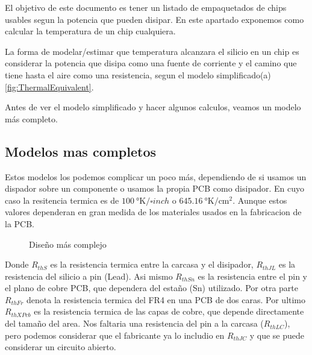 El objetivo de este documento es tener un listado de empaquetados de chips usables segun
la potencia que pueden disipar. En este apartado exponemos como calcular la temperatura de un
chip cualquiera.

La forma de modelar/estimar que temperatura alcanzara el silicio en un chip es considerar
la potencia que disipa como una fuente de corriente y el camino que tiene hasta el aire como
una resistencia, segun el modelo simplificado(a)\ref{fig:ThermalEquivalent}.

Antes de ver el modelo simplificado y hacer algunos calculos, veamos un modelo más completo.

\subsection{Modelos mas completos}
Estos modelos los podemos complicar un poco más, dependiendo de si usamos un dispador sobre un componente o
usamos la propia PCB como disipador. En cuyo caso la resitencia termica es
de $\SI{100}{\degree\kelvin/\square{inch}}$ o $\SI{645.16}{\degree\kelvin/\square\cm}$.
Aunque estos valores dependeran en gran medida de los materiales usados en la
fabricacion de la PCB.


\begin{figure}[H]
    \centering
    
    \caption{Diseño más complejo}
    \label{fig:ThermalEquivFull}
\end{figure}

Donde $R_{thS}$ es la resistencia termica entre la carcasa y el disipador, $R_{thJL}$ es la
resistencia del silicio a pin (Lead). Asi mismo $R_{thSn}$ es la resistencia entre el pin
y el plano de cobre PCB, que dependera del estaño (Sn) utilizado. Por otra parte $R_{thFr}$
denota la resistencia termica del FR4 en una PCB de dos caras. Por ultimo $R_{thXPcb}$ es la
resistencia termica de las capas de cobre, que depende directamente del tamaño del area.
Nos faltaria una resistencia del pin a la carcasa ($R_{thLC}$), pero podemos considerar que el fabricante ya lo includio en $R_{thJC}$ y que se puede considerar un circuito abierto.

